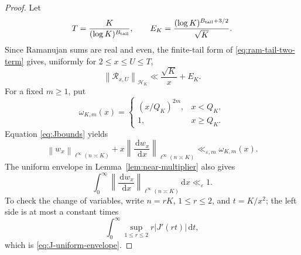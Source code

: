 \documentclass[11pt]{article}
\numberwithin{equation}{section}
\theoremstyle{definition}
\newcommand{\1}{\mathbf 1}
\newcommand{\dd}{\,\mathrm d}
\newcommand{\norm}[1]{\left\lVert#1\right\rVert}
\begin{document}
\begin{proof}
Let
\[
 T=\frac K{(\log K)^{B_{\rm tail}}},\qquad
 E_K=\frac{(\log K)^{B_{\rm tail}+3/2}}{\sqrt K}.
\]
Since Ramanujan sums are real and even, the finite-tail form of
\eqref{eq:ram-tail-two-term} gives, uniformly for
\(2\le x\le U\le T\),
\begin{equation}\label{eq:near-finite-tail}
 \norm{\mathcal R_{x,U}}_{\mathcal H_K}
 \ll\frac{\sqrt K}{x}+E_K.
\end{equation}
For a fixed \(m\ge1\), put
\[
 \omega_{K,m}(x)=
 \begin{cases}
  (x/Q_K)^{2m},&x<Q_K,\\
  1,&x\ge Q_K.
 \end{cases}
\]
Equation \eqref{eq:Jbounds} yields
\begin{equation}\label{eq:near-weight-envelope}
 \norm{w_x}_{\ell^\infty(n\asymp K)}
 +x\norm{\frac{\dd w_x}{\dd x}}_{\ell^\infty(n\asymp K)}
 \ll_{\varepsilon,m}\omega_{K,m}(x).
\end{equation}
The uniform envelope in Lemma~\ref{lem:near-multiplier} also gives
\begin{equation}\label{eq:J-total-variation}
 \int_0^\infty
 \norm{\frac{\dd w_x}{\dd x}}_{\ell^\infty(n\asymp K)}
 \dd x\ll_\varepsilon1.
\end{equation}
To check the change of variables, write \(n=rK\), \(1\le r\le2\),
and \(t=K/x^2\); the left side is at most a constant times
\[
 \int_0^\infty\sup_{1\le r\le2}r|J'(rt)|\dd t,
\]
which is \eqref{eq:J-uniform-envelope}.


\end{proof}
\end{document}
